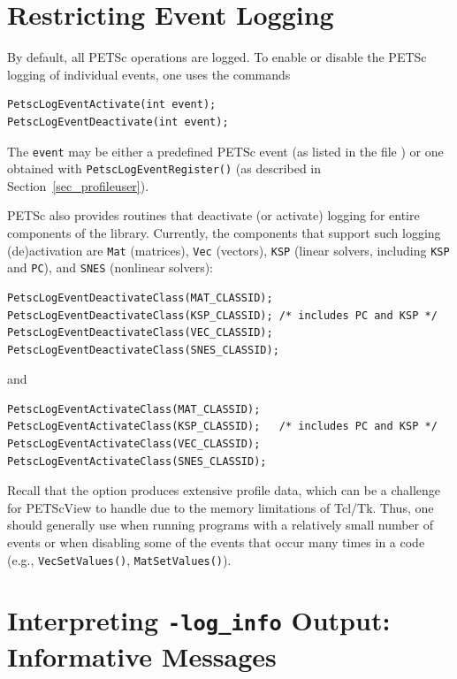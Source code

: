 {{\section{Restricting Event Logging}
\label{sec_deactivate}

By default, all PETSc operations are logged.
To enable or disable the PETSc logging of individual events, one uses the commands
\begin{lstlisting}
PetscLogEventActivate(int event);
PetscLogEventDeactivate(int event);
\end{lstlisting}
The \lstinline{event} may be either a predefined PETSc event (as listed in
the file ) or one obtained with
\lstinline{PetscLogEventRegister()} (as described in Section~\ref{sec_profileuser}).

PETSc also provides routines that deactivate (or activate)
logging for entire components of the library. Currently, the
components that support such logging (de)activation are \lstinline{Mat} (matrices),
\lstinline{Vec} (vectors), \lstinline{KSP} (linear solvers, including \lstinline{KSP}
and \lstinline{PC}), and \lstinline{SNES} (nonlinear solvers):
\begin{lstlisting}
PetscLogEventDeactivateClass(MAT_CLASSID);
PetscLogEventDeactivateClass(KSP_CLASSID); /* includes PC and KSP */
PetscLogEventDeactivateClass(VEC_CLASSID);
PetscLogEventDeactivateClass(SNES_CLASSID);
\end{lstlisting}
and
\begin{lstlisting}
PetscLogEventActivateClass(MAT_CLASSID);
PetscLogEventActivateClass(KSP_CLASSID);   /* includes PC and KSP */
PetscLogEventActivateClass(VEC_CLASSID);
PetscLogEventActivateClass(SNES_CLASSID);
\end{lstlisting}

Recall that the option  produces extensive profile
data, which can be a challenge for PETScView to handle due to
the memory limitations of Tcl/Tk.  Thus, one should generally use
 when running programs with a relatively small
number of events or when disabling some of the events that occur many
times in a code (e.g., \lstinline{VecSetValues()}, \lstinline{MatSetValues()}).


\section{Interpreting {\tt -log\_info} Output: Informative Messages}
\label{sec_PetscLoginfo}

}}
